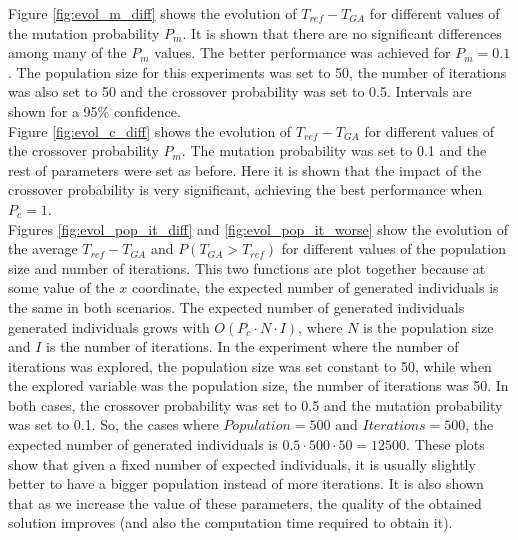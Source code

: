 \documentclass[10pt,a4paper]{article}
\begin{document}
Figure \ref{fig:evol_m_diff} shows the evolution of $T_{ref} - T_{GA}$ for different values of the mutation probability $P_m$. It is shown that there are no significant differences among many of the $P_m$ values. The better performance was achieved for $P_m = 0.1$. The population size for this experiments was set to 50, the number of iterations was also set to 50 and the crossover probability was set to 0.5. Intervals are shown for a 95\% confidence.\\

Figure \ref{fig:evol_c_diff} shows the evolution of $T_{ref} - T_{GA}$ for different values of the crossover probability $P_m$. The mutation probability was set to 0.1 and the rest of parameters were set as before. Here it is shown that the impact of the crossover probability is very significant, achieving the best performance when $P_c = 1$.\\

Figures \ref{fig:evol_pop_it_diff} and \ref{fig:evol_pop_it_worse} show the evolution of the average $T_{ref} - T_{GA}$ and $P(T_{GA} > T_{ref})$ for different values of the population size and number of iterations. This two functions are plot together because at some value of the $x$ coordinate, the expected number of generated individuals is the same in both scenarios. The expected number of generated individuals generated individuals grows with $O(P_c \cdot N \cdot I)$, where $N$ is the population size and $I$ is the number of iterations. In the experiment where the number of iterations was explored, the population size was set constant to 50, while when the explored variable was the population size, the number of iterations was 50. In both cases, the crossover probability was set to 0.5 and the mutation probability was set to 0.1. So, the cases where $Population = 500$ and $Iterations = 500$, the expected number of generated individuals is $0.5 \cdot 500 \cdot 50 = 12500$. These plots show that given a fixed number of expected individuals, it is usually slightly better to have a bigger population instead of more iterations. It is also shown that as we increase the value of these parameters, the quality of the obtained solution improves (and also the computation time required to obtain it).\\
\end{document}
